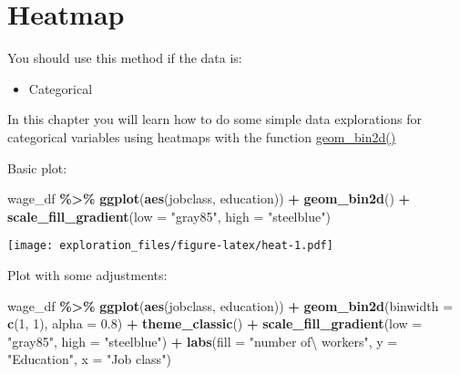 \documentclass[
]{book}
\newenvironment{Shaded}{\begin{snugshade}}{\end{snugshade}}
\newcommand{\DataTypeTok}[1]{\textcolor[rgb]{0.13,0.29,0.53}{#1}}
\newcommand{\DecValTok}[1]{\textcolor[rgb]{0.00,0.00,0.81}{#1}}
\newcommand{\FloatTok}[1]{\textcolor[rgb]{0.00,0.00,0.81}{#1}}
\newcommand{\KeywordTok}[1]{\textcolor[rgb]{0.13,0.29,0.53}{\textbf{#1}}}
\newcommand{\NormalTok}[1]{#1}
\newcommand{\OperatorTok}[1]{\textcolor[rgb]{0.81,0.36,0.00}{\textbf{#1}}}
\newcommand{\StringTok}[1]{\textcolor[rgb]{0.31,0.60,0.02}{#1}}
\providecommand{\tightlist}{%
  \setlength{\itemsep}{0pt}\setlength{\parskip}{0pt}}
\begin{document}
\hypertarget{heatmap}{%
\chapter{Heatmap}\label{heatmap}}

You should use this method if the data is:

\begin{itemize}
\tightlist
\item
  Categorical
\end{itemize}

In this chapter you will learn how to do some simple data explorations for categorical variables using heatmaps with the function \href{https://ggplot2.tidyverse.org/reference/geom_bin2d.html}{geom\_bin2d()}

Basic plot:

\begin{Shaded}
\begin{Highlighting}[]
\NormalTok{wage\_df }\OperatorTok{\%\textgreater{}\%}
\StringTok{  }\KeywordTok{ggplot}\NormalTok{(}\KeywordTok{aes}\NormalTok{(jobclass, education)) }\OperatorTok{+}
\StringTok{  }\KeywordTok{geom\_bin2d}\NormalTok{() }\OperatorTok{+}
\StringTok{  }\KeywordTok{scale\_fill\_gradient}\NormalTok{(}\DataTypeTok{low =} \StringTok{"gray85"}\NormalTok{, }\DataTypeTok{high =} \StringTok{"steelblue"}\NormalTok{) }
\end{Highlighting}
\end{Shaded}

\texttt{[image: exploration\_files/figure-latex/heat-1.pdf]}

Plot with some adjustments:

\begin{Shaded}
\begin{Highlighting}[]
\NormalTok{wage\_df }\OperatorTok{\%\textgreater{}\%}
\StringTok{  }\KeywordTok{ggplot}\NormalTok{(}\KeywordTok{aes}\NormalTok{(jobclass, education)) }\OperatorTok{+}
\StringTok{  }\KeywordTok{geom\_bin2d}\NormalTok{(}\DataTypeTok{binwidth =} \KeywordTok{c}\NormalTok{(}\DecValTok{1}\NormalTok{, }\DecValTok{1}\NormalTok{), }\DataTypeTok{alpha =} \FloatTok{0.8}\NormalTok{) }\OperatorTok{+}
\StringTok{  }\KeywordTok{theme\_classic}\NormalTok{() }\OperatorTok{+}\StringTok{ }
\StringTok{  }\KeywordTok{scale\_fill\_gradient}\NormalTok{(}\DataTypeTok{low =} \StringTok{"gray85"}\NormalTok{, }\DataTypeTok{high =} \StringTok{"steelblue"}\NormalTok{) }\OperatorTok{+}
\StringTok{  }\KeywordTok{labs}\NormalTok{(}\DataTypeTok{fill =} \StringTok{"number of\textbackslash{} workers"}\NormalTok{, }\DataTypeTok{y =} \StringTok{"Education"}\NormalTok{, }\DataTypeTok{x =} \StringTok{"Job class"}\NormalTok{)}
\end{Highlighting}
\end{Shaded}
\end{document}
